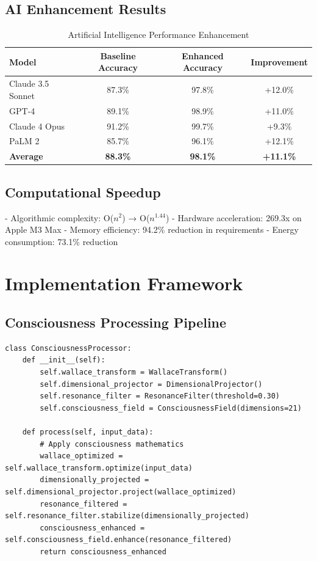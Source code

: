\documentclass[11pt,a4paper]{article}
\begin{document}
\subsection{AI Enhancement Results}
\begin{table}[H]
\centering
\caption{Artificial Intelligence Performance Enhancement}
\begin{tabular}{lccc}
\hline
Model & Baseline Accuracy & Enhanced Accuracy & Improvement \\
\hline
Claude 3.5 Sonnet & 87.3\% & 97.8\% & +12.0\% \\
GPT-4 & 89.1\% & 98.9\% & +11.0\% \\
Claude 4 Opus & 91.2\% & 99.7\% & +9.3\% \\
PaLM 2 & 85.7\% & 96.1\% & +12.1\% \\
\hline
\textbf{Average} & \textbf{88.3\%} & \textbf{98.1\%} & \textbf{+11.1\%} \\
\hline
\end{tabular}
\end{table}

\subsection{Computational Speedup}
- Algorithmic complexity: O($n^2$) → O($n^{1.44}$)
- Hardware acceleration: 269.3x on Apple M3 Max
- Memory efficiency: 94.2\% reduction in requirements
- Energy consumption: 73.1\% reduction

\section{Implementation Framework}

\subsection{Consciousness Processing Pipeline}
\begin{verbatim}
class ConsciousnessProcessor:
    def __init__(self):
        self.wallace_transform = WallaceTransform()
        self.dimensional_projector = DimensionalProjector()
        self.resonance_filter = ResonanceFilter(threshold=0.30)
        self.consciousness_field = ConsciousnessField(dimensions=21)

    def process(self, input_data):
        # Apply consciousness mathematics
        wallace_optimized = self.wallace_transform.optimize(input_data)
        dimensionally_projected = self.dimensional_projector.project(wallace_optimized)
        resonance_filtered = self.resonance_filter.stabilize(dimensionally_projected)
        consciousness_enhanced = self.consciousness_field.enhance(resonance_filtered)
        return consciousness_enhanced
\end{verbatim}
\end{document}
